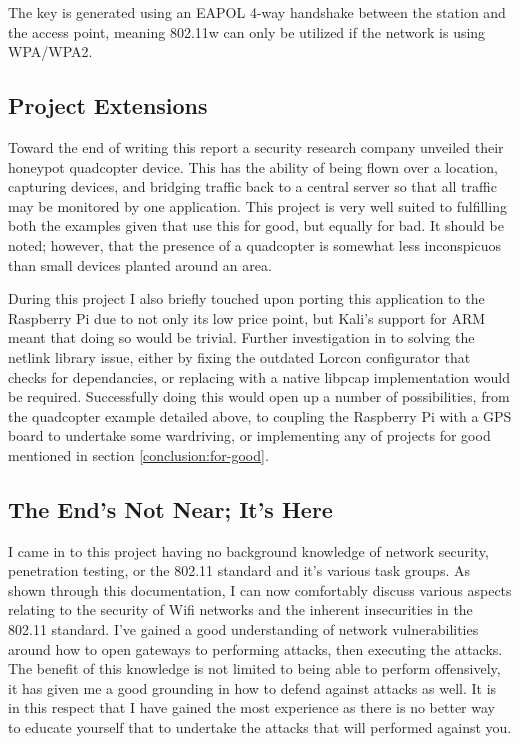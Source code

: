 The key is generated using an EAPOL 4-way handshake between the station and the access point, meaning 802.11w can only be utilized if the network is using WPA/WPA2.

\subsection{Project Extensions}

Toward the end of writing this report a security research company unveiled their honeypot quadcopter device. This has the ability of being flown over a location, capturing devices, and bridging traffic back to a central server so that all traffic may be monitored by one application. This project is very well suited to fulfilling both the examples given that use this for good, but equally for bad. It should be noted; however, that the presence of a quadcopter is somewhat less inconspicuos than small devices planted around an area. 

During this project I also briefly touched upon porting this application to the Raspberry Pi due to not only its low price point, but Kali's support for ARM meant that doing so would be trivial. Further investigation in to solving the netlink library issue, either by fixing the outdated Lorcon configurator that checks for dependancies, or replacing with a native libpcap implementation would be required. Successfully doing this would open up a number of possibilities, from the quadcopter example detailed above, to coupling the Raspberry Pi with a GPS board to undertake some wardriving, or implementing any of projects for good mentioned in section \ref{conclusion:for-good}.
\newpage
\subsection{The End's Not Near; It's Here}
I came in to this project having no background knowledge of network security, penetration testing, or the 802.11 standard and it’s various task groups. As shown through this documentation, I can now comfortably discuss various aspects relating to the security of Wifi networks and the inherent insecurities in the 802.11 standard. I’ve gained a good understanding of network vulnerabilities around how to open gateways to performing attacks, then executing the attacks. The benefit of this knowledge is not limited to being able to perform offensively, it has given me a good grounding in how to defend against attacks as well. It is in this respect that I have gained the most experience as there is no better way to educate yourself that to undertake the attacks that will performed against you.

